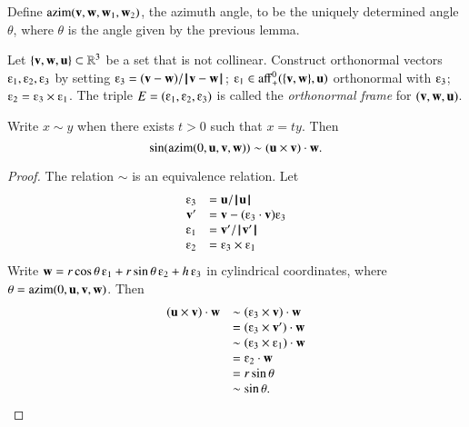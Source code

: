 \begin{definition}[azim] 
Define ${\operatorname{azim}}({\mathbf v},{\mathbf w},{\mathbf w}_1,{\mathbf w}_2)$, the azimuth angle, 
to be the uniquely determined
angle $\theta$, where $\theta$ is the angle given by the previous
lemma.
%
%
%
\end{definition}

\begin{definition}[frame]
Let $\{{\mathbf v},{\mathbf w},{\mathbf u}\}\subset\mathbb{R}^3$ be a set that is not collinear.
Construct orthonormal vectors  $\e_1,\e_2,\e_3$ by setting
$\e_3 = (\v-\w)/\norm{\v}{\w}$; 
$\e_1\in\op{aff}_+^0(\{\v,\w\},\u)$ orthonormal with $\e_3$;
$\e_2 = \e_3\times \e_1$.
 The triple $E=(\e_1,\e_2,\e_3)$ is called
the {\it orthonormal frame} for $({\mathbf v},{\mathbf w},{\mathbf u})$.
\end{definition}
%

\begin{lemma}\label{lemma:sim}
Write $x\sim y$ when there exists $t>0$ such that $x= t y$. 
Then 
$$\sin({\operatorname{azim}}(0,{\mathbf u},{\mathbf v},{\mathbf w}))\sim ({\mathbf u} \times {\mathbf v})\cdot {\mathbf w}.$$
\end{lemma}

\begin{proof}
The relation $\sim$ is an equivalence relation.
Let
$$
\begin{array}{rll}
   \e_3 &= \u/\normo{\u}\\
   \v' &= \v - (\e_3\cdot \v) \e_3\\
   \e_1 &= \v'/\normo{\v'}\\
   \e_2 &= \e_3 \times \e_1 \\
\end{array}
$$
Write $\w= r\cos\theta\, \e_1 + r\sin\theta \, \e_2 + h\, \e_3$ in cylindrical coordinates, where $\theta = {\operatorname{azim}}(0,{\mathbf u},{\mathbf v},{\mathbf w})$.
Then
$$
\begin{array}{rll}
   (\u\times \v)\cdot \w &\sim (\e_3\times \v)\cdot \w\\
   &= (\e_3\times \v')\cdot \w\\
   &\sim (\e_3\times \e_1)\cdot \w\\
   &= \e_2 \cdot \w\\
   &= r\sin\theta \\
   &\sim \sin\theta.
\end{array}
$$
\end{proof}

